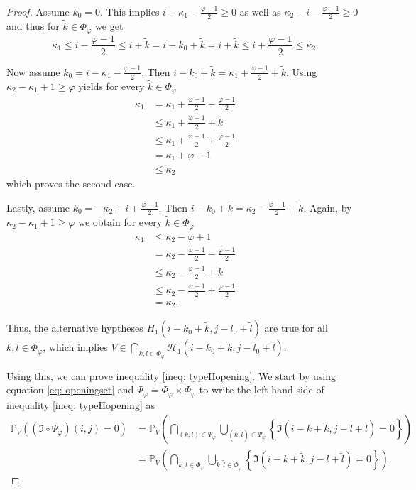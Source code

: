 \documentclass[a4paper,12pt]{article}
\theoremstyle{plain}
\theoremstyle{definition}
\begin{document}
\begin{proof}
	Assume $k_0 = 0$. This implies $i - \kappa_1 - \frac{\varphi - 1}{2} \geq 0$ as well as $\kappa_2 - i - \frac{\varphi - 1}{2} \geq 0$ and thus for $\tilde{k} \in \Phi_\varphi$ we get
	\begin{equation*}
		\kappa_1 \leq i - \frac{\varphi - 1}{2} \leq i + \tilde{k} = i - k_0 + \tilde{k} = i + \tilde{k} \leq i + \frac{\varphi - 1}{2} \leq \kappa_2.
	\end{equation*}
	
	Now assume $k_0 = i - \kappa_1 - \frac{\varphi - 1}{2}$. Then $i - k_0 + \tilde{k} = \kappa_1 + \frac{\varphi - 1}{2} + \tilde{k}$. Using $\kappa_2 - \kappa_1 + 1 \geq \varphi$ yields for every $\tilde{k} \in \Phi_\varphi$
	\begin{align*}
		\kappa_1 &= \kappa_1 + \frac{\varphi - 1}{2} - \frac{\varphi - 1}{2} \\
		&\leq \kappa_1 + \frac{\varphi - 1}{2} + \tilde{k} \\
		&\leq \kappa_1 + \frac{\varphi - 1}{2} + \frac{\varphi - 1}{2} \\
		&= \kappa_1 + \varphi - 1 \\
		&\leq \kappa_2
	\end{align*}
	which proves the second case.
	
	Lastly, assume $k_0 = - \kappa_2 + i + \frac{\varphi - 1}{2}$. Then $i - k_0 + \tilde{k} = \kappa_2 - \frac{\varphi - 1}{2} + \tilde{k}$. Again, by $\kappa_2 - \kappa_1 + 1 \geq \varphi$ we obtain for every $\tilde{k} \in \Phi_\varphi$
	\begin{align*}
		\kappa_1 &\leq \kappa_2 - \varphi + 1 \\
		&= \kappa_2 - \frac{\varphi - 1}{2} - \frac{\varphi - 1}{2} \\
		&\leq \kappa_2 - \frac{\varphi - 1}{2} + \tilde{k} \\
		&\leq \kappa_2 - \frac{\varphi - 1}{2} + \frac{\varphi - 1}{2} \\
		&= \kappa_2.
	\end{align*}
	
	Thus, the alternative hyptheses $H_1(i - k_0 + \tilde{k}, j - l_0 + \tilde{l})$ are true for all $\tilde{k}, \tilde{l} \in \Phi_\varphi$, which implies $V \in \bigcap_{\tilde{k}, \tilde{l} \in \Phi_\varphi} \mathcal{H}_1(i - k_0 + \tilde{k}, j - l_0 + \tilde{l})$.
	
	Using this, we can prove inequality \eqref{ineq: typeIIopening}. We start by using equation \eqref{eq: openingset} and $\Psi_\varphi = \Phi_\varphi \times \Phi_\varphi$ to write the left hand side of inequality \eqref{ineq: typeIIopening} as
	\begin{align*}
		\mathbb{P}_V\left( (\mathfrak{I} \circ \Psi_\varphi)(i, j) = 0 \right) &= \mathbb{P}_V\left( \bigcap_{(k, l) \in \Psi_\varphi} \bigcup_{(\tilde{k}, \tilde{l}) \in \Psi_\varphi} \left\{ \mathfrak{I}(i - k + \tilde{k}, j - l + \tilde{l}) = 0 \right\} \right) \\
		&= \mathbb{P}_V\left( \bigcap_{k, l \in \Phi_\varphi} \bigcup_{\tilde{k}, \tilde{l} \in \Phi_\varphi} \left\{ \mathfrak{I}(i - k + \tilde{k}, j - l + \tilde{l}) = 0 \right\} \right).
	\end{align*}
	

\end{proof}
\end{document}
